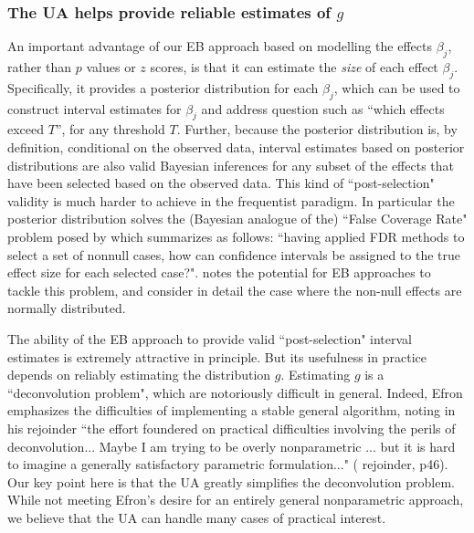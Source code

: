 \documentclass[11pt]{article}
\def\bhat{\hat{\beta}}
\begin{document}
\subsubsection*{The UA helps provide reliable estimates of $g$}

An important advantage of our EB approach based on modelling the effects $\beta_j$, rather than $p$ values or $z$ scores, is that it
can estimate the {\it size} of each effect $\beta_j$.
Specifically, it provides a posterior distribution for each $\beta_j$, which can be used
to construct interval estimates for $\beta_j$ and address question such as ``which effects exceed $T$'', for any 
threshold $T$.
Further, because the posterior distribution is, by definition,
conditional on the observed data, interval estimates based on posterior distributions are also valid Bayesian inferences for any subset of the effects that have
been selected based on the observed data. This kind of ``post-selection" validity is much harder to achieve in the frequentist paradigm.
In particular the posterior distribution solves the (Bayesian analogue of the) ``False Coverage Rate" problem posed by
\cite{benjamini2005false} which \cite{efron2008microarrays} summarizes as follows: ``having applied FDR methods to select a set of nonnull cases,
how can confidence intervals be assigned to the true
effect size for each selected case?". \cite{efron2008microarrays} notes the potential for EB approaches to tackle this problem,
and \cite{zhao2012empirical} consider in detail the case where the non-null effects are normally distributed.

The ability of the EB approach to provide valid ``post-selection" interval estimates is extremely attractive in principle.
But its usefulness in practice
depends on reliably estimating the distribution $g$. Estimating $g$ is a ``deconvolution problem",
which are notoriously difficult in general. Indeed, Efron emphasizes
the difficulties of implementing a stable general algorithm, noting in his rejoinder
``the effort foundered on practical difficulties involving the perils of deconvolution... Maybe I am trying
to be overly nonparametric ... but it is hard to imagine a
generally satisfactory parametric formulation..." (\cite{efron2008microarrays} rejoinder, p46).
Our key point here is that the UA greatly simplifies the deconvolution problem.
While not meeting Efron's desire for an entirely general nonparametric approach, we believe 
that the UA can handle many cases of practical interest. 
\end{document}
